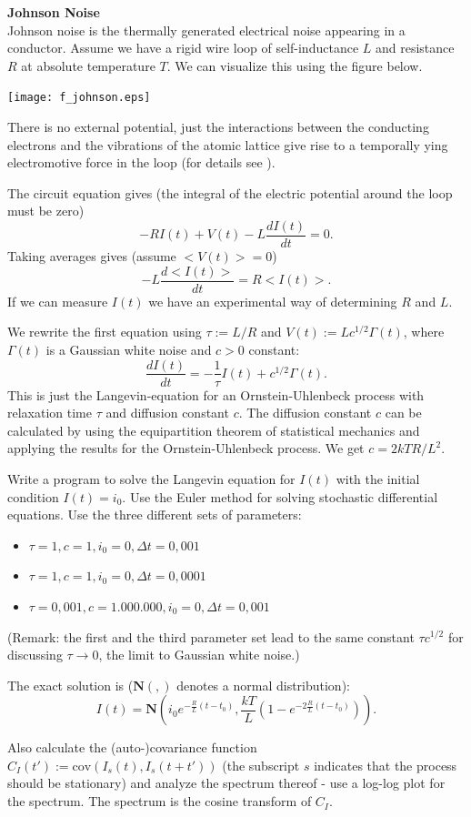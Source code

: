 \begin{Ex}
\label{Johnson_Noise}
\textbf{Johnson Noise \cite[]{gillespie:96} } \\
Johnson noise is the thermally generated electrical noise appearing in a conductor. 
Assume we have a rigid wire loop of self-inductance $L$ and resistance $R$ at
absolute temperature $T$. We can visualize this using the figure below. 
\begin{center}
\texttt{[image: f\_johnson.eps]}
\end{center}
There is no external potential, just the interactions between the conducting
electrons and the vibrations of the atomic lattice give rise to a temporally ying
electromotive force in the loop (for details see \cite[]{gillespie:96}). 

The circuit equation gives (the integral of the electric potential around the 
loop must be zero)
$$ -RI(t)+V(t)-L\frac{dI(t)}{dt}=0.$$
Taking averages gives (assume $<V(t)>=0$) $$ -L\frac{d<I(t)>}{dt} =R<I(t)> .$$
If we can measure $I(t)$ we have an experimental way of determining $R$ and $L$.

We rewrite the first equation using $\tau:=L/R$ and $V(t):=Lc^{1/2}\Gamma(t)$, where
$\Gamma(t)$ is a Gaussian white noise and $c>0$ constant:
$$ \frac{dI(t)}{dt}=-\frac{1}{\tau}I(t)+c^{1/2}\Gamma(t) .$$
This is just the Langevin-equation for an Ornstein-Uhlenbeck process with
relaxation time $\tau$ and diffusion constant $c.$
The diffusion constant $c$ can be calculated by using the equipartition
theorem of statistical mechanics and applying the results for the 
Ornstein-Uhlenbeck process. We get $c=2kTR/L^2.$

Write a program to solve the Langevin equation for $I(t)$ with the initial
condition $I(t)=i_0.$ Use the Euler method for solving stochastic
differential equations. Use the three different sets of parameters:
\begin{itemize}
\item $\tau=1, c=1, i_0=0, \Delta t=0,001 $
\item $\tau=1, c=1, i_0=0, \Delta t=0,0001 $
\item $\tau=0,001, c=1.000.000, i_0=0, \Delta t=0,001 $
\end{itemize}
(Remark: the first and the third parameter set lead to the same
constant $\tau c^{1/2}$ for discussing $\tau\to 0$, the limit to Gaussian
white noise.)

The exact solution is ($\mathbf{N}( , )$ denotes a normal distribution):
$$ I(t)= \mathbf{N}\left(i_0e^{- \frac{R}{L}(t-t_0)} , \frac{kT}{L}
        \left(1-e^{-2\frac{R}{L}(t-t_0)}\right) \right) .$$

Also calculate the (auto-)covariance function $ C_I(t'):=\text{cov}(I_s(t),I_s(t+t')) $
(the subscript $s$ indicates that the process should be stationary)
and analyze the spectrum thereof - use a log-log plot for the
spectrum. The spectrum is the cosine transform of $C_I$.
\end{Ex}








